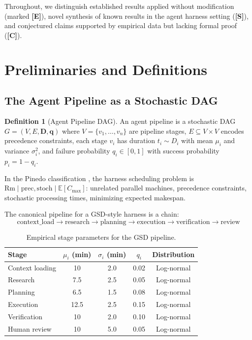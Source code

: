 \documentclass[11pt,a4paper]{article}
\theoremstyle{definition}
\newtheorem{definition}[theorem]{Definition}
\theoremstyle{remark}
\newcommand{\E}{\mathbb{E}}
\begin{document}
Throughout, we distinguish established results applied without modification (marked \textbf{[E]}), novel synthesis of known results in the agent harness setting (\textbf{[S]}), and conjectured claims supported by empirical data but lacking formal proof (\textbf{[C]}).


\section{Preliminaries and Definitions}\label{sec:prelim}

\subsection{The Agent Pipeline as a Stochastic DAG}

\begin{definition}[Agent Pipeline DAG]\label{def:pipeline}
An agent pipeline is a stochastic DAG $G = (V, E, \mathbf{D}, \mathbf{q})$ where $V = \{v_1, \ldots, v_n\}$ are pipeline stages, $E \subseteq V \times V$ encodes precedence constraints, each stage $v_i$ has duration $t_i \sim D_i$ with mean $\mu_i$ and variance $\sigma_i^2$, and failure probability $q_i \in [0,1]$ with success probability $p_i = 1 - q_i$.
\end{definition}

In the Pinedo classification \citep{pinedo2016scheduling}, the harness scheduling problem is $\mathrm{Rm} \mid \mathrm{prec}, \mathrm{stoch} \mid \E[C_{\max}]$: unrelated parallel machines, precedence constraints, stochastic processing times, minimizing expected makespan.

The canonical pipeline for a GSD-style harness is a chain:
\[
    \text{context\_load} \to \text{research} \to \text{planning} \to \text{execution} \to \text{verification} \to \text{review}
\]

\begin{table}[ht]
\centering
\caption{Empirical stage parameters for the GSD pipeline.}\label{tab:stages}
\begin{tabular}{lcccc}
\toprule
Stage & $\mu_i$ (min) & $\sigma_i$ (min) & $q_i$ & Distribution \\
\midrule
Context loading & 10 & 2.0 & 0.02 & Log-normal \\
Research & 7.5 & 2.5 & 0.05 & Log-normal \\
Planning & 6.5 & 1.5 & 0.08 & Log-normal \\
Execution & 12.5 & 2.5 & 0.15 & Log-normal \\
Verification & 10 & 2.0 & 0.10 & Log-normal \\
Human review & 10 & 5.0 & 0.05 & Log-normal \\
\bottomrule
\end{tabular}
\end{table}
\end{document}
